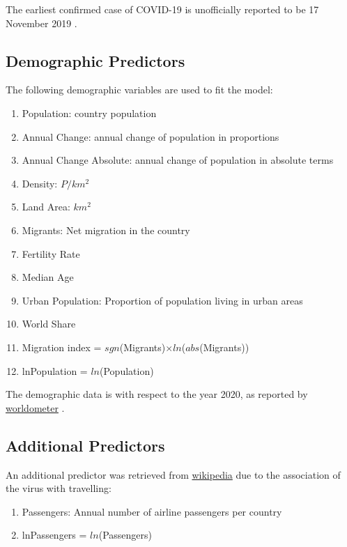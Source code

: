 \documentclass[]{report}
\begin{document}
The earliest confirmed case  of COVID-19 is  unofficially reported to be 17 November 2019 \cite{scmp}.

\subsection{Demographic Predictors}
The following demographic variables are used to fit the model:

\begin{enumerate}
	\item Population: country population
	\item Annual Change: annual change of population in proportions
	\item Annual Change Absolute: annual change of population in absolute terms 
	\item Density: $P/km^2$
	\item Land Area: $km^2$
	\item Migrants: Net migration in the country
	\item Fertility Rate
	\item Median Age
	\item Urban Population: Proportion of population living in urban areas
	\item World Share
	\item Migration index =  $sgn$(Migrants)$\times ln$($abs$(Migrants))
	\item lnPopulation = $ln$(Population)
\end{enumerate}

The demographic data is with respect to the year 2020, as reported by \href{https://www.worldometers.info/world-population/population-by-country/}{worldometer} \cite{worldometer}.

\subsection{Additional Predictors}

An additional predictor was retrieved from  \href{https://en.wikipedia.org/wiki/List_of_countries_by_airline_passengers}{wikipedia} \cite{wikipedia} due to the association of the virus with travelling:

\begin{enumerate}
	
	\item Passengers: Annual number of airline passengers per country
	
	\item lnPassengers = $ln$(Passengers)
\end{enumerate}
\end{document}
